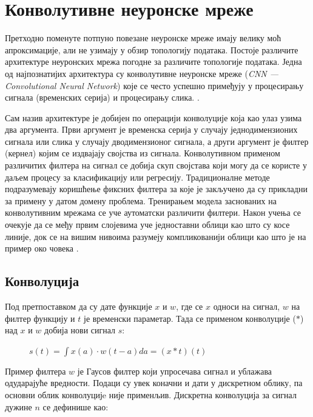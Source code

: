 \documentclass[11pt,oneside]{memoir}
\begin{document}
\section{Конволутивне неуронске мреже}

Претходно поменуте потпуно повезане неуронске мреже имају велику моћ апроксимације, али не узимају у обзир топологију података. Постоје
различите архитектуре неуронских мрежа погодне за различите топологије података. Једна од најпознатијих архитектура су
конволутивне неуронске мреже (\textit{CNN --- Convolutional Neural Network}) које се често успешно примеђују у процесирању сигнала (временских
серија) и процесирању слика. \cite{deep_learning_goodfellow}.

Сам назив архитектуре је добијен по операцији конволуције која као улаз узи\-ма два аргумента. Први аргумент је временска серија у случају
једнодимензионих сигнала или слика у случају дводимензионог сигнала, а други аргумент је филтер (кернел) којим
се издвајају својства из сигнала. Конволутивном применом
различитих филтера на сигнал се добија скуп својстава који могу да се користе у даљем процесу за класификацију или регресију. Традиционалне
методе подразумевају коришћење фиксних филтера за које је закључено да су прикладни за примену у датом домену проблема. Тренирањем модела
заснованих на конволутивним мрежама се уче аутоматски различити филтери. Након учења се очекује да се међу првим слојевима
уче једноставни облици као што су косе линије, док се на вишим нивоима разумеју компликованији облици као што је на пример око човека
\cite{deep_learning_goodfellow, ml_mladen}.

\subsection{Конволуција}

Под претпоставком да су дате функције $x$ и $w$, где се $x$ односи на сигнал, $w$ на филтер функцију и $t$ је временски параметар.
Тада се применом конволуције ($*$) над $x$ и $w$ добија нови сигнал $s$:

\begin{figure}[H]
  \centering
  $s(t) = \int x(a)\cdot w(t - a) da = (x*t)(t)$
\end{figure}

Пример филтера $w$ је Гаусов филтер који упросечава сигнал и ублажава одударајуће вредности. Подаци су увек коначни и дати у дискретном облику, 
па основни облик конволуцијe није применљив. Дискретна конволуција за сигнал дужине $n$ се дефинише као:
\end{document}

